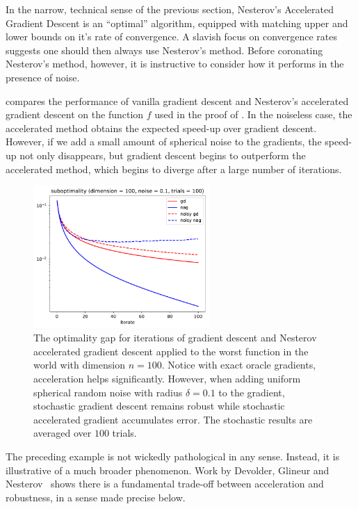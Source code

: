 In the narrow, technical sense of the previous section, Nesterov's Accelerated Gradient 
Descent is an ``optimal'' algorithm, equipped with matching upper and lower bounds on 
it's rate of convergence. A slavish focus on convergence rates suggests one should then
always use Nesterov's method. Before coronating Nesterov's method, however, it
is instructive to consider how it performs in the presence of noise.

 compares the performance of vanilla gradient
descent and Nesterov's accelerated gradient descent on the function $f$ used in
the proof of . In the noiseless case, the
accelerated method obtains the expected speed-up over gradient descent. However,
if we add a small amount of spherical noise to the gradients, the speed-up not
only disappears, but gradient descent begins to outperform the accelerated
method, which begins to diverge after a large number of iterations.

\begin{figure}[ht]
\begin{center}
\includegraphics[width=0.6\textwidth]{figures/nag-noise.pdf}
\end{center}
\caption{The optimality gap for iterations of gradient descent and Nesterov accelerated gradient descent applied to the worst function in the world with dimension $n=100$. Notice with exact oracle gradients, acceleration helps significantly. However, when adding uniform spherical random noise with radius $\delta=0.1$ to the gradient, stochastic gradient descent remains robust while stochastic accelerated gradient accumulates error. The stochastic results are averaged over $100$ trials.}
\end{figure}

The preceding example is not wickedly pathological in any sense. Instead, it is
illustrative of a much broader phenomenon. Work by Devolder, Glineur and
Nesterov~\cite{devolder2014first} shows there is a
fundamental trade-off between acceleration and robustness, in a sense
made precise below. 

